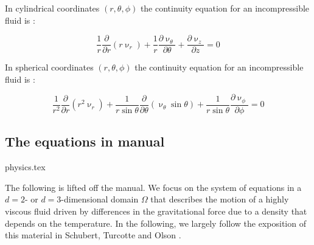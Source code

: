 In cylindrical coordinates $(r,\theta,\phi)$ 
the continuity equation for an incompressible fluid is :

\begin{mdframed}[backgroundcolor=blue!5]
\[
\frac{1}{r} \frac{\partial}{\partial r} (r \upnu_r) 
+
\frac{1}{r} \frac{\partial \upnu_\theta}{\partial \theta}
+
\frac{\partial \upnu_z}{\partial z}=0
\]
\end{mdframed}


In spherical coordinates $(r,\theta,\phi)$ 
the continuity equation for an incompressible fluid is :

\begin{mdframed}[backgroundcolor=blue!5]
\begin{equation}
\frac{1}{r^2} \frac{\partial}{\partial r} (r^2 \upnu_r) 
+
\frac{1}{r \sin\theta} \frac{\partial}{\partial \theta} (\upnu_\theta \sin\theta)
+
\frac{1}{r \sin\theta} \frac{\partial \upnu_\phi}{\partial \phi}=0
\label{eq:divsc}
\end{equation}
\end{mdframed}



\subsection{The equations in \aspect manual}
\begin{flushright} {\tiny {\color{gray} physics.tex}} \end{flushright}

The following is lifted off the \aspect manual.
We focus on the system of equations in a $d=2$- or $d=3$-dimensional
domain $\Omega$ that describes the motion of a highly viscous fluid driven
by differences in the gravitational force due to a density that depends on
the temperature. In the following, we largely follow the exposition of this
material in Schubert, Turcotte and Olson \cite{scto01}.

